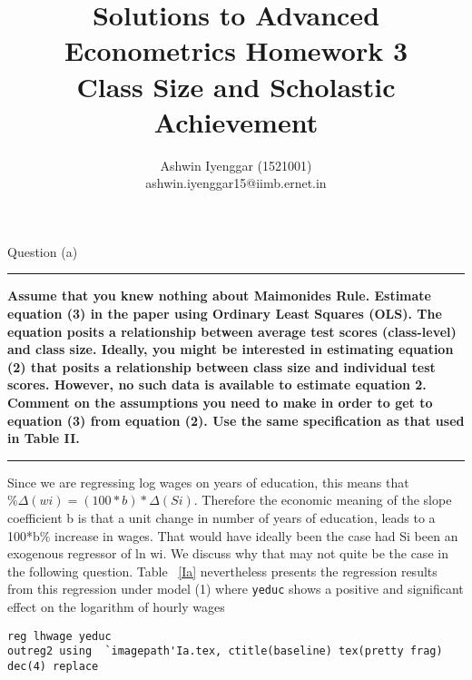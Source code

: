 \documentclass[12pt]{article}
\newcommand\question[1]{\vspace{1em}\hrule\vspace{1em}\textbf{#1}\vspace{1em}\hrule\vspace{1em}}
\begin{document}
\title{Solutions to Advanced Econometrics Homework 3\\Class Size and Scholastic Achievement}
\author{Ashwin Iyenggar  (1521001) \\ ashwin.iyenggar15@iimb.ernet.in} 


\maketitle
\thispagestyle{empty}


\begin{center}\LARGE{Question (a)}\end{center}

\question{Assume that you knew nothing about Maimonides Rule.  Estimate equation (3) in the paper using Ordinary Least Squares (OLS). The equation posits a relationship between average test scores (class-level) and class size. Ideally, you might be interested in estimating equation (2) that posits a relationship between class size and individual test scores. However, no such data is available to estimate equation 2. Comment on the assumptions you need to make in order to get to equation (3) from equation (2).   Use the same specification as that used in Table II.
 }
Since we are regressing log wages on years of education, this means that $\%\Delta(wi) = (100*b)*\Delta(Si)$. Therefore the  economic meaning of the slope coefficient b is that a unit change in number of years of education, leads to a 100*b\% increase in wages. That would have ideally been the case had Si been an exogenous regressor of ln wi. We discuss why that may not quite be the case in the following question. Table ~\ref{Ia} nevertheless presents the regression  results from this regression under model (1) where \verb|yeduc| shows a positive and significant effect on the logarithm of hourly wages
\begin{lstlisting}
reg lhwage yeduc
outreg2 using  `imagepath'Ia.tex, ctitle(baseline) tex(pretty frag) dec(4) replace
\end{lstlisting}
\end{document}
